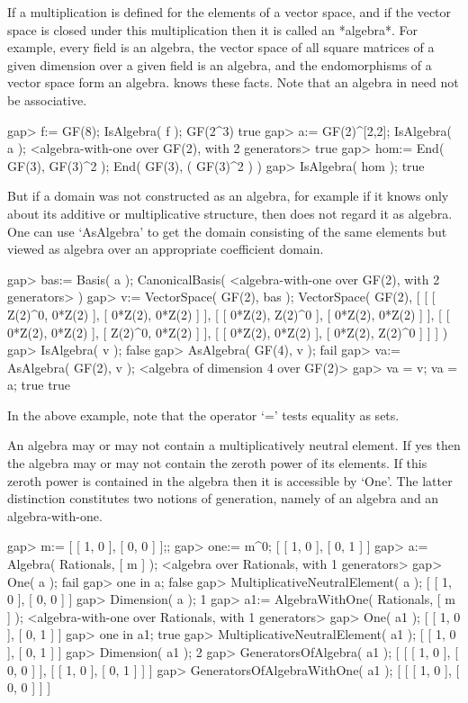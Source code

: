 
If a multiplication is defined for the elements of a vector space,
and if the vector space is closed under this multiplication then it is
called an *algebra*.
For example, every field is an algebra, the vector space of all
square matrices of a given dimension over a given field is an algebra,
and the endomorphisms of a vector space form an algebra.
{\GAP} knows these facts.
Note that an algebra in {\GAP} need not be associative.

\beginexample
    gap> f:= GF(8); IsAlgebra( f );
    GF(2^3)
    true
    gap> a:= GF(2)^[2,2]; IsAlgebra( a );
    <algebra-with-one over GF(2), with 2 generators>
    true
    gap> hom:= End( GF(3), GF(3)^2 );
    End( GF(3), ( GF(3)^2 ) )
    gap> IsAlgebra( hom );
    true
\endexample

But if a domain was not constructed as an algebra,
for example if it knows only about its additive or multiplicative
structure, then {\GAP} does not regard it as algebra.
One can use `AsAlgebra' to get the domain consisting of the same elements
but viewed as algebra over an appropriate coefficient domain.

\beginexample
    gap> bas:= Basis( a );
    CanonicalBasis( <algebra-with-one over GF(2), with 2 generators> )
    gap> v:= VectorSpace( GF(2), bas );
    VectorSpace( GF(2), [ [ [ Z(2)^0, 0*Z(2) ], [ 0*Z(2), 0*Z(2) ] ], 
      [ [ 0*Z(2), Z(2)^0 ], [ 0*Z(2), 0*Z(2) ] ], 
      [ [ 0*Z(2), 0*Z(2) ], [ Z(2)^0, 0*Z(2) ] ], 
      [ [ 0*Z(2), 0*Z(2) ], [ 0*Z(2), Z(2)^0 ] ] ] )
    gap> IsAlgebra( v );
    false
    gap> AsAlgebra( GF(4), v );
    fail
    gap> va:= AsAlgebra( GF(2), v );
    <algebra of dimension 4 over GF(2)>
    gap> va = v; va = a;
    true
    true
\endexample

In the above example, note that the operator `=' tests equality as sets.

An algebra may or may not contain a multiplicatively neutral element.
If yes then the algebra may or may not contain the zeroth power
of its elements.
If this zeroth power is contained in the algebra then it is accessible
by `One'.
The latter distinction constitutes two notions of generation,
namely of an algebra and an algebra-with-one.

\beginexample
    gap> m:= [ [ 1, 0 ], [ 0, 0 ] ];;
    gap> one:= m^0;
    [ [ 1, 0 ], [ 0, 1 ] ]
    gap> a:= Algebra( Rationals, [ m ] );
    <algebra over Rationals, with 1 generators>
    gap> One( a );
    fail
    gap> one in a;
    false
    gap> MultiplicativeNeutralElement( a );
    [ [ 1, 0 ], [ 0, 0 ] ]
    gap> Dimension( a );
    1
    gap> a1:= AlgebraWithOne( Rationals, [ m ] );
    <algebra-with-one over Rationals, with 1 generators>
    gap> One( a1 );
    [ [ 1, 0 ], [ 0, 1 ] ]
    gap> one in a1;
    true
    gap> MultiplicativeNeutralElement( a1 );
    [ [ 1, 0 ], [ 0, 1 ] ]
    gap> Dimension( a1 );
    2
    gap> GeneratorsOfAlgebra( a1 );
    [ [ [ 1, 0 ], [ 0, 0 ] ], [ [ 1, 0 ], [ 0, 1 ] ] ]
    gap> GeneratorsOfAlgebraWithOne( a1 );
    [ [ [ 1, 0 ], [ 0, 0 ] ] ]
\endexample

